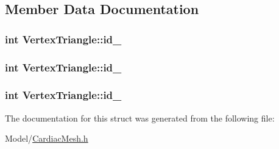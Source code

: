 \subsection{Member Data Documentation}
\hypertarget{struct_vertex_triangle_a02c83b5bd5c880951ae988a330f66898}{
\subsubsection[{id\+\_\+1}]{\setlength{\rightskip}{0pt plus 5cm}int Vertex\+Triangle\+::id\+\_}}\label{struct_vertex_triangle_a02c83b5bd5c880951ae988a330f66898}
\hypertarget{struct_vertex_triangle_a181c3625c4cae44d95a068dd3005b553}{
\subsubsection[{id\+\_\+2}]{\setlength{\rightskip}{0pt plus 5cm}int Vertex\+Triangle\+::id\+\_}}\label{struct_vertex_triangle_a181c3625c4cae44d95a068dd3005b553}
\hypertarget{struct_vertex_triangle_a4790abaf5729d50fe5ef8b18e3c12654}{
\subsubsection[{id\+\_\+3}]{\setlength{\rightskip}{0pt plus 5cm}int Vertex\+Triangle\+::id\+\_}}\label{struct_vertex_triangle_a4790abaf5729d50fe5ef8b18e3c12654}


The documentation for this struct was generated from the following file\+:\begin{DoxyCompactItemize}
\item 
Model/\hyperlink{_cardiac_mesh_8h}{Cardiac\+Mesh.\+h}\end{DoxyCompactItemize}

